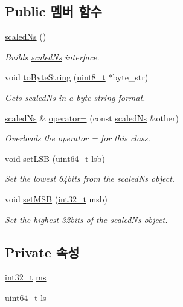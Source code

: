 \subsection*{Public 멤버 함수}
\begin{DoxyCompactItemize}
\item 
\hyperlink{classscaled_ns_a408ba6654c58e155dcaff9cafd3b4255}{scaled\+Ns} ()
\begin{DoxyCompactList}\small\item\em Builds \hyperlink{classscaled_ns}{scaled\+Ns} interface. \end{DoxyCompactList}\item 
void \hyperlink{classscaled_ns_acd2477c3b4df4f055d57ceae73e545a0}{to\+Byte\+String} (\hyperlink{stdint_8h_aba7bc1797add20fe3efdf37ced1182c5}{uint8\+\_\+t} $\ast$byte\+\_\+str)
\begin{DoxyCompactList}\small\item\em Gets \hyperlink{classscaled_ns}{scaled\+Ns} in a byte string format. \end{DoxyCompactList}\item 
\hyperlink{classscaled_ns}{scaled\+Ns} \& \hyperlink{classscaled_ns_a6fd791e8ef1533713b3d6624bcb368e4}{operator=} (const \hyperlink{classscaled_ns}{scaled\+Ns} \&other)
\begin{DoxyCompactList}\small\item\em Overloads the operator = for this class. \end{DoxyCompactList}\item 
void \hyperlink{classscaled_ns_af1ae2f0b6b9b14bbddc9a2d718b2934a}{set\+L\+SB} (\hyperlink{parse_8c_aec6fcb673ff035718c238c8c9d544c47}{uint64\+\_\+t} lsb)
\begin{DoxyCompactList}\small\item\em Set the lowest 64bits from the \hyperlink{classscaled_ns}{scaled\+Ns} object. \end{DoxyCompactList}\item 
void \hyperlink{classscaled_ns_a90d2eac1d58471006ab8c0b5ad192ca9}{set\+M\+SB} (\hyperlink{parse_8c_a37994e3b11c72957c6f454c6ec96d43d}{int32\+\_\+t} msb)
\begin{DoxyCompactList}\small\item\em Set the highest 32bits of the \hyperlink{classscaled_ns}{scaled\+Ns} object. \end{DoxyCompactList}\end{DoxyCompactItemize}
\subsection*{Private 속성}
\begin{DoxyCompactItemize}
\item 
\hyperlink{parse_8c_a37994e3b11c72957c6f454c6ec96d43d}{int32\+\_\+t} \hyperlink{classscaled_ns_a578044f719d8aa5d03b6946020e666f6}{ms}
\item 
\hyperlink{parse_8c_aec6fcb673ff035718c238c8c9d544c47}{uint64\+\_\+t} \hyperlink{classscaled_ns_a700a3d499d075f959691271b70cb18eb}{ls}
\end{DoxyCompactItemize}


